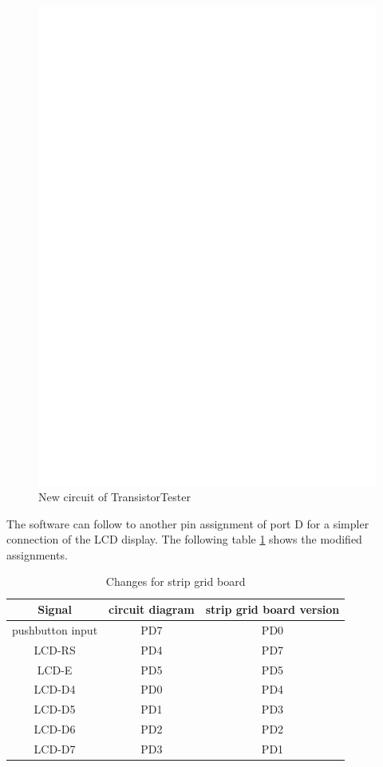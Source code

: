 \begin{figure}[H]
\centering
\includegraphics[width=18cm]{../FIG/ttester.eps}
\caption{New circuit of TransistorTester}
\label{fig:ttester}
\end{figure}
The software can follow to another pin assignment of port D for a simpler connection of the
LCD display. 
The following table \ref{tab:grid-change} shows the modified assignments.

\begin{table}[H]
  \begin{center}
    \begin{tabular}{| c | c | c |}
    \hline
       Signal & circuit diagram & strip grid board version\\
    \hline
    pushbutton input  &  PD7   &  PD0 \\
    LCD-RS    &  PD4      & PD7 \\
    LCD-E     &  PD5   & PD5 \\
    LCD-D4    &  PD0   & PD4 \\
    LCD-D5    &  PD1   & PD3 \\
    LCD-D6    &  PD2   & PD2 \\
    LCD-D7    &  PD3   & PD1 \\
    \hline
    \end{tabular}
  \end{center}
  \caption{Changes for strip grid board}
  \label{tab:grid-change}
\end{table}

